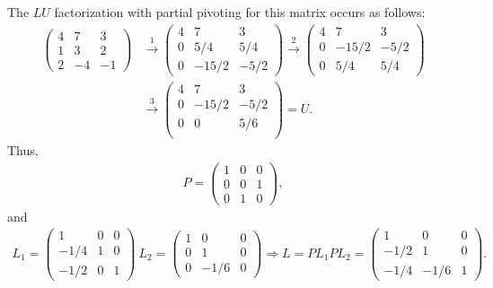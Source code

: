 The $LU$ factorization with partial pivoting for this matrix occurs as follows:
\begin{align}
    \label{eq:PLU-factorization}
    \begin{pmatrix}
        4 & 7 & 3 \\
        1 & 3 & 2 \\
        2 & -4 & -1
    \end{pmatrix}
    &\stackrel{1}{\rightarrow}
    \begin{pmatrix}
        4 & 7 & 3 \\
        0 & 5/4 & 5/4 \\
        0 & -15/2 & -5/2
    \end{pmatrix}
    \stackrel{2}{\rightarrow}
    \begin{pmatrix}
        4 & 7 & 3 \\
        0 & -15/2 & -5/2 \\
        0 & 5/4 & 5/4
    \end{pmatrix} 
    \\
    &\stackrel{3}{\rightarrow}
    \begin{pmatrix}
        4 & 7 & 3 \\
        0 & -15/2 & -5/2 \\
        0 & 0 & 5/6 \\
    \end{pmatrix}
    = U
.\end{align}
Thus, 
\begin{eqnarray}
    \label{eq:P-mat}
    P = 
    \begin{pmatrix}
        1 & 0 & 0 \\
        0 & 0 & 1 \\
        0 & 1 & 0
    \end{pmatrix}
,\end{eqnarray}
and 
\begin{eqnarray}
    \label{eq:Lmats}
    L_{1} = 
    \begin{pmatrix}
        1 & 0 & 0 \\
        -1/4 & 1 & 0 \\
        -1/2 & 0 & 1 
    \end{pmatrix}
    ~
    L_{2} = 
    \begin{pmatrix}
        1 & 0 & 0 \\
        0 & 1 & 0 \\
        0 & -1/6 & 0
    \end{pmatrix}
    \Rightarrow
    L = P L_1 P L_2 = 
    \begin{pmatrix}
        1 & 0 & 0 \\
        -1/2 & 1 & 0 \\
        -1/4 & -1/6 & 1
    \end{pmatrix}
.\end{eqnarray}

